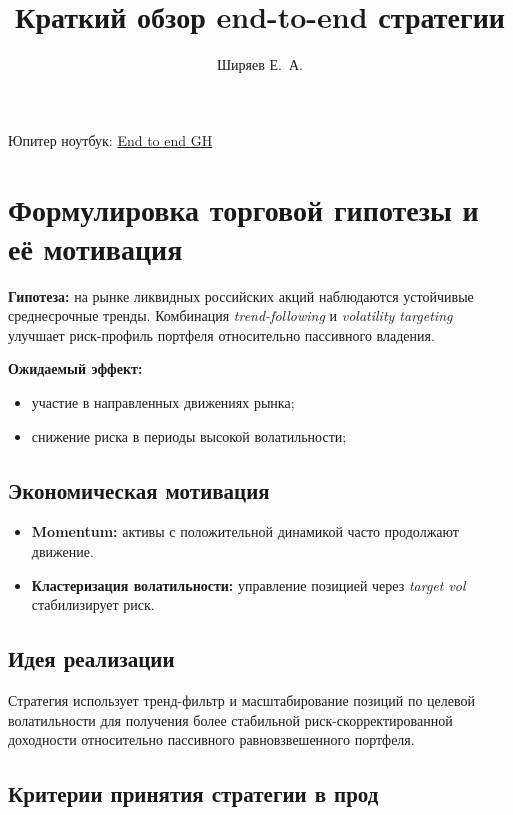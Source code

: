 \documentclass[12pt]{article}
\title{Краткий обзор end-to-end стратегии}
\author{Ширяев Е.\ А.}
\date{}
\begin{document}
\maketitle

\noindent Юпитер ноутбук: \href{https://github.com/tenzenmonsta/End-to-end-quant-strategy}{End to end GH}

\section{Формулировка торговой гипотезы и её мотивация}
\textbf{Гипотеза:} на рынке ликвидных российских акций наблюдаются устойчивые среднесрочные тренды.
Комбинация \textit{trend-following} и \textit{volatility targeting} улучшает риск-профиль портфеля относительно пассивного владения.

\medskip
\textbf{Ожидаемый эффект:}
\begin{itemize}
    \item участие в направленных движениях рынка;
    \item снижение риска в периоды высокой волатильности;
\end{itemize}

\subsection*{Экономическая мотивация}
\begin{itemize}
    \item \textbf{Momentum:} активы с положительной динамикой часто продолжают движение.
    \item \textbf{Кластеризация волатильности:} управление позицией через \textit{target vol} стабилизирует риск.
\end{itemize}

\subsection*{Идея реализации}
Стратегия использует тренд-фильтр и масштабирование позиций по целевой волатильности для получения более стабильной риск-скорректированной доходности относительно пассивного равновзвешенного портфеля.


\subsection*{Критерии принятия стратегии в прод}
\end{document}
